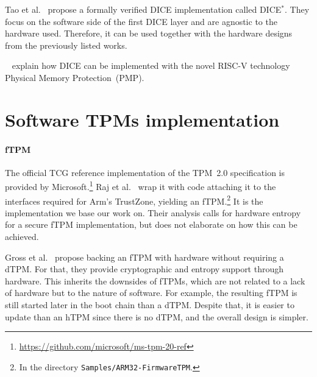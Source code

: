 Tao et al.~\cite{272306} propose a formally verified \ac{DICE} implementation called DICE\( ^* \).
They focus on the software side of the first DICE layer and are agnostic to the hardware used.
Therefore, it can be used together with the hardware designs from the previously listed works.

~\cite{Bravi2023} explain how DICE can be implemented with the novel RISC-V technology Physical Memory Protection~(PMP).

\section{Software \acsp{TPM} implementation}



\paragraph{\Acl{fTPM}}

The official \ac{TCG} reference implementation of the TPM~2.0 specification is provided by Microsoft.\footnote{\url{https://github.com/microsoft/ms-tpm-20-ref}}
Raj et al.~\cite{Raj2015} wrap it with code attaching it to the interfaces required for Arm's TrustZone, yielding an \ac{fTPM}.\footnote{In the directory \texttt{Samples/ARM32-FirmwareTPM}.}
It is the implementation we base our work on.
Their analysis calls for hardware entropy for a secure \ac{fTPM} implementation, but does not elaborate on how this can be achieved.

Gross et al.~\cite{Gross2021} propose backing an \ac{fTPM} with hardware without requiring a \ac{dTPM}.
For that, they provide cryptographic and entropy support through hardware.
This inherits the downsides of \acp{fTPM}, which are not related to a lack of hardware but to the nature of software.
For example, the resulting \ac{fTPM} is still started later in the boot chain than a \ac{dTPM}\@.
Despite that, it is easier to update than an hTPM since there is no dTPM, and the overall design is simpler.

